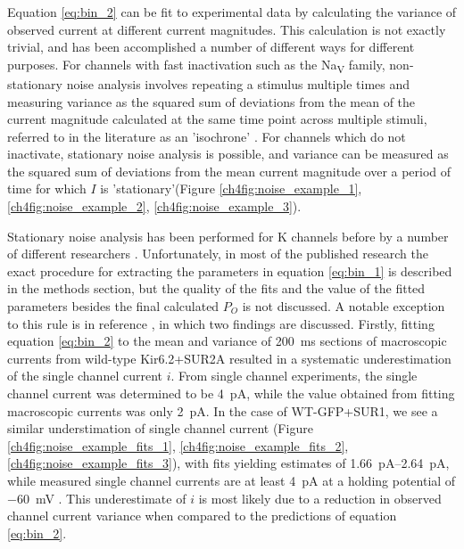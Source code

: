 Equation \ref{eq:bin_2} can be fit to experimental data by calculating the variance of observed current at different current magnitudes.
This calculation is not exactly trivial, and has been accomplished a number of different ways for different purposes.
For channels with fast inactivation such as the Na\textsubscript{V} family, non-stationary noise analysis involves repeating a stimulus multiple times and measuring variance as the squared sum of deviations from the mean of the current magnitude calculated at the same time point across multiple stimuli, referred to in the literature as an 'isochrone' \cite{sigworth_variance_1980}.
For channels which do not inactivate, stationary noise analysis is possible, and variance can be measured as the squared sum of deviations from the mean current magnitude over a period of time for which $I$ is 'stationary'(Figure \ref{ch4fig:noise_example_1}, \ref{ch4fig:noise_example_2}, \ref{ch4fig:noise_example_3}).

Stationary noise analysis has been performed for K\ATP{} channels before by a number of different researchers \cite{shyng_control_1997, cukras_role_2002, babenko_sur-dependent_2002, tammaro_mutation_2007, pratt_sulfonylurea_2009, proks_activation_2010-1, pratt_engineered_2012-1}.
Unfortunately, in most of the published research the exact procedure for extracting the parameters in equation \ref{eq:bin_1} is described in the methods section, but the quality of the fits and the value of the fitted parameters besides the final calculated $P_O$ is not discussed.
A notable exception to this rule is in reference \cite{tammaro_mutation_2007}, in which two findings are discussed.
Firstly, fitting equation \ref{eq:bin_2} to the mean and variance of \SI{200}{\milli\second} sections of macroscopic currents from wild-type Kir6.2+SUR2A resulted in a systematic underestimation of the single channel current $i$.
From single channel experiments, the single channel current was determined to be \SI{4}{\pico\ampere}, while the value obtained from fitting macroscopic currents was only \SI{2}{\pico\ampere}.
In the case of WT-GFP+SUR1, we see a similar understimation of single channel current (Figure \ref{ch4fig:noise_example_fits_1}, \ref{ch4fig:noise_example_fits_2}, \ref{ch4fig:noise_example_fits_3}), with fits yielding estimates of \SIrange{1.66}{2.64}{\pico\ampere}, while measured single channel currents are at least \SI{4}{\pico\ampere} at a holding potential of \SI{-60}{\milli\volt} \cite{shyng_control_1997, proks_mutations_2001}.
This underestimate of $i$ is most likely due to a reduction in observed channel current variance when compared to the predictions of equation \ref{eq:bin_2}. 

